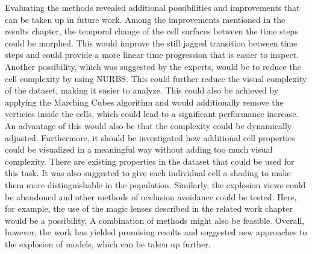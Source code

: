 Evaluating the methods revealed additional possibilities and improvements that can be taken up in future work. Among the improvements mentioned in the results chapter, the temporal change of the cell surfaces between the time steps could be morphed. This would improve the still jagged transition between time steps and could provide a more linear time progression that is easier to inspect. Another possibility, which was suggested by the experts, would be to reduce the cell complexity by using NURBS. %
This could further reduce the visual complexity of the dataset, making it easier to analyze. This could also be achieved by applying the Marching Cubes algorithm and would additionally remove the verticies inside the cells, which could lead to a significant performance increase. An advantage of this would also be that the complexity could be dynamically adjusted.
Furthermore, it should be investigated how additional cell properties could be visualized in a meaningful way without adding too much visual complexity. There are existing properties in the dataset that could be used for this task. It was also suggested to give each individual cell a shading to make them more distinguishable in the population. 
Similarly, the explosion views could be abandoned and other methods of occlusion avoidance could be tested. Here, for example, the use of the magic lenses described in the related work chapter would be a possibility. A combination of methods might also be feasible.
Overall, however, the work has yielded promising results and suggested new approaches to the explosion of models, which can be taken up further.